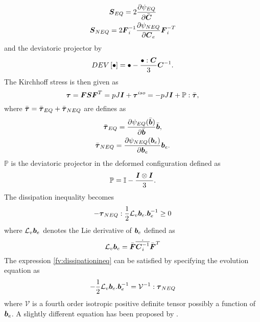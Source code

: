 \documentclass[11pt,twoside,TimesRoman]{article}
\newcommand{\parder}[2]{{\dfrac{\partial #1}{\partial #2}}}
\begin{document}
\begin{gather}
\bfS_{EQ} = 2\parder{\psi_{EQ}}{\bfCbar} \\
\bfS_{NEQ} = 2 \bfF_i^{-1} \parder{\psi_{NEQ}}{\bfC_e}\bfF_i^{-T}
\end{gather}
and the deviatoric projector by
\begin{equation}
DEV\left[ \bullet\right] = \bullet - \frac{\bullet:\mbox{\boldmath $C$}}{3} \mbox{\boldmath $C$}^{-1}.
\end{equation}
The Kirchhoff stress is then given as
\begin{equation}
	\boldsymbol{\tau} = \mbox{\boldmath $F$} \mbox{\boldmath $S$} \mbox{\boldmath $F$}^T = pJ\mbox{\boldmath $I$} + {\mbox{\boldmath $\tau$}}^{iso} = -pJ\mbox{\boldmath $I$} + \mathbb{P}:\bar{\mbox{\boldmath $\tau$}},
\end{equation}
where $\bar{\mbox{\boldmath $\tau$}} = \bar{\mbox{\boldmath $\tau$}}_{EQ} + \bar{\mbox{\boldmath $\tau$}}_{NEQ}$ are defines as 
\begin{gather}
	\bar{\bftau}_{EQ} = \parder{\psi_{EQ}(\bar{\bfb})}{\bar{\bfb}}\bar{\bfb}, \\
	\bar{\bftau}_{NEQ} = \parder{\psi_{NEQ}({\bfb}_e)}{{\bfb}_e}{{\bfb}_e}.
\end{gather}
$\mathbb{P}$ is the deviatoric projector in the deformed configuration defined as 
\begin{equation}
\mathbb{P} = \mathbb{I} - \frac{\mbox{\boldmath $I$} \otimes \mbox{\boldmath $I$}}{3}.
\end{equation}
The dissipation inequality becomes 
\begin{equation}
-\boldsymbol{\tau}_{NEQ}:\frac{1}{2} \mathcal{L}_v\mbox{\boldmath $b$}_e. \mbox{\boldmath $b$}_e^{-1} \geq 0
\label{fv:dissipationineq}
\end{equation}
where $\mathcal{L}_v\mbox{\boldmath $b$}_e$ denotes the Lie derivative of $\mbox{\boldmath $b$}_e$ defined as 
\begin{equation}
\mathcal{L}_v\mbox{\boldmath $b$}_e = \bar{\mbox{\boldmath $F$}} \dot{\overline{ \mbox{\boldmath $C$}_i^{-1}}} \bar{\mbox{\boldmath $F$}}^T
\end{equation}
The expression \ref{fv:dissipationineq} can be satisfied by specifying the evolution equation as
\begin{equation}
-\frac{1}{2} \mathcal{L}_v\mbox{\boldmath $b$}_e. \mbox{\boldmath $b$}_e^{-1}  = \mathcal{V}^{-1} : \boldsymbol{\tau}_{NEQ}
\label{fv:evolution}
\end{equation}
where $\mathcal{V}$ is a fourth order isotropic positive definite tensor possibly a function of $\mbox{\boldmath $b$}_e$. A slightly different equation has been proposed by \cite{Bergstrom1998}.
\end{document}
